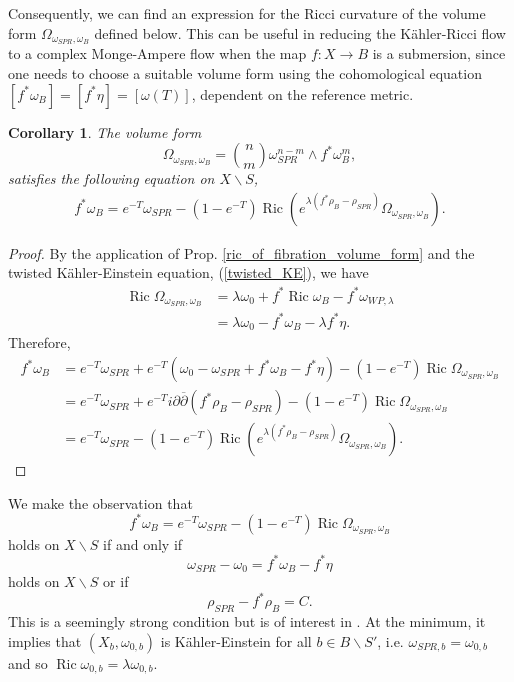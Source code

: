 \documentclass[12pt]{article}
\newtheorem{corollary}[theorem]{Corollary}
\numberwithin{equation}{section}
\renewcommand{\d}{\partial}
\newcommand{\dbar}{\overline{\partial}}
\DeclareMathOperator{\Ric}{Ric}
\begin{document}
\noindent Consequently, we can find an expression for the Ricci curvature of the volume form $\Omega_{\omega_{SPR},\omega_B}$ defined below. This can be useful in reducing the K\"ahler-Ricci flow to a complex Monge-Ampere flow when the map $f:X \to B$ is a submersion, since one needs to choose a suitable volume form using the cohomological equation $[f^*\omega_B] = [f^*\eta] = [\omega(T)]$, dependent on the reference metric.

\begin{corollary}
The volume form
\begin{equation*}
    \Omega_{\omega_{SPR},\omega_B} = {n \choose m} \omega^{n-m}_{SPR} \wedge f^*\omega_B^m,
\end{equation*}
satisfies the following equation on $X \backslash S$,
\begin{align}\label{base_metric_1_volume_form_ric_curvature}
    f^*\omega_B = e^{-T} \omega_{SPR}  - (1-e^{-T})\Ric(e^{\lambda(f^*\rho_B-\rho_{SPR})} \Omega_{\omega_{SPR},\omega_B}).
\end{align}
\end{corollary}

\begin{proof}
By the application of Prop. \ref{ric_of_fibration_volume_form} and the twisted K\"ahler-Einstein equation, (\ref{twisted_KE}), we have
\begin{align*}
    \Ric \Omega_{\omega_{SPR},\omega_B} &= \lambda \omega_0 + f^* \Ric \omega_B - f^* \omega_{WP,\lambda}\\
    &= \lambda \omega_0 - f^*\omega_B - \lambda f^*\eta.
\end{align*}
Therefore,
\begin{align*}
    f^*\omega_B &= e^{-T} \omega_{SPR} + e^{-T}(\omega_0 - \omega_{SPR} + f^*\omega_B - f^*\eta) - (1-e^{-T})\Ric \Omega_{\omega_{SPR},\omega_B}\\
    &= e^{-T} \omega_{SPR} + e^{-T}i\d\dbar(f^*\rho_B - \rho_{SPR}) - (1-e^{-T}) \Ric \Omega_{\omega_{SPR},\omega_B}\\
    &=e^{-T} \omega_{SPR}  - (1-e^{-T})\Ric(e^{\lambda(f^*\rho_B-\rho_{SPR})} \Omega_{\omega_{SPR},\omega_B}).
\end{align*}
\end{proof}

\noindent We make the observation that
\begin{equation*}
    f^*\omega_B = e^{-T} \omega_{SPR}  - (1-e^{-T}) \Ric \Omega_{\omega_{SPR},\omega_B}
\end{equation*}
holds on $X \backslash S$ if and only if
\begin{equation*}
    \omega_{SPR} - \omega_0 = f^*\omega_B - f^*\eta
\end{equation*}
holds on $X \backslash S$ or if 
\begin{equation*}
    \rho_{SPR} - f^*\rho_B = C.
\end{equation*}
This is a seemingly strong condition but is of interest in \cite{B25}. At the minimum, it implies that $(X_b,\omega_{0,b})$ is K\"ahler-Einstein for all $b \in B \backslash S'$, i.e. $\omega_{SPR,b} = \omega_{0,b}$ and so $\Ric \omega_{0,b} = \lambda \omega_{0,b}$.\\
\end{document}
